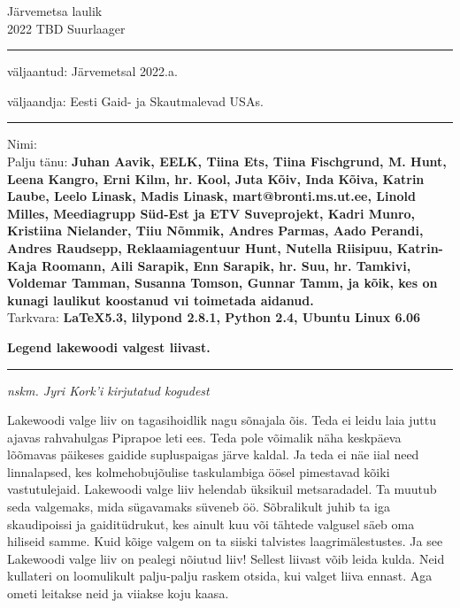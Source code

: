\documentclass[10pt]{book}
\begin{document}
\rmfamily

\begin{titlepage}
  \null
  \begin{center}
    \vspace{1.5in}
    {\LARGE Järvemetsa laulik }\\
    { 2022 TBD Suurlaager }
    \vfill
  \end{center}
\end{titlepage}

\null
\vspace{0.5in}
\hrule height 0.05ex
\vspace{.1in}
\centerline{\footnotesize v\"aljaantud: J\"arvemetsal 2022.a.}
\centerline{\footnotesize v\"aljaandja: Eesti Gaid- ja Skautmalevad USAs.    }
\vspace{.1in}
\hrule height 0.05ex
\vspace{.25in}
Nimi:\dotfill
\vfill
{}\\
{\footnotesize Palju t\"anu: \bf{Juhan Aavik, EELK, Tiina Ets, Tiina Fischgrund, M. Hunt, Leena Kangro, Erni Kilm, hr. Kool, Juta K\~oiv, Inda K\~oiva, Katrin Laube, Leelo Linask, Madis Linask, mart@bronti.ms.ut.ee, Linold Milles, Meediagrupp S\"ud-Est ja ETV Suveprojekt, Kadri Munro, Kristiina Nielander, Tiiu N\~ommik, Andres Parmas, Aado Perandi, Andres Raudsepp, Reklaamiagentuur Hunt, Nutella Riisipuu, Katrin-Kaja Roomann, Aili Sarapik, Enn Sarapik, hr. Suu, hr. Tamkivi, Voldemar Tamman, Susanna Tomson, Gunnar Tamm, ja k\~oik, kes on kunagi laulikut koostanud vıi toimetada aidanud. }}\\
{\footnotesize Tarkvara: \bf{\LaTeX 5.3, lilypond 2.8.1, Python 2.4, Ubuntu Linux 6.06}}
\clearpage
\null
\vspace{2in}
\cleardoublepage
{\samepage\raggedbottom
\raggedright
\sloppy
\centerline{ {\bf {\large Legend lakewoodi valgest liivast.}}}
\vspace{0.1in}
\hrule height 0.05ex
\vspace{0.1in}
\centerline{ {\em {\footnotesize nskm. Jyri Kork'i kirjutatud kogudest}}}}
\vspace{.05in}

Lakewoodi valge liiv on tagasihoidlik nagu s\~onajala \~ois.  Teda ei leidu laia juttu ajavas rahvahulgas Piprapoe leti ees.  Teda pole v\~oimalik n\"aha keskp\"aeva l\~o\~omavas p\"aikeses gaidide supluspaigas j\"arve kaldal.  Ja teda ei n\"ae iial need linnalapsed, kes kolmehobuj\~oulise taskulambiga \"o\"osel pimestavad k\~oiki vastutulejaid.  Lakewoodi valge liiv helendab \"uksikuil metsaradadel.  Ta muutub seda valgemaks, mida s\"ugavamaks s\"uveneb \"o\"o.  S\~obralikult juhib ta iga skaudipoissi ja gaidit\"udrukut, kes ainult kuu v\~oi t\"ahtede valgusel s\"aeb oma hiliseid samme.  Kuid k\~oige valgem on ta siiski talvistes laagrim\"alestustes.  Ja see Lakewoodi valge liiv on pealegi n\~oiutud liiv!  Sellest liivast v\~oib leida kulda.  Neid kullateri on loomulikult palju-palju raskem otsida, kui valget liiva ennast.  Aga ometi leitakse neid ja viiakse koju kaasa.
\end{document}
